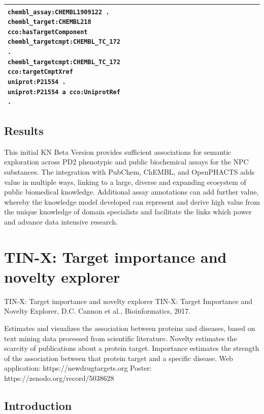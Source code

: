 \begin{singlespace}
\begin{longtable}{p{0.4\linewidth}p{0.6\linewidth}}
{\texttt{chembl\_assay:CHEMBL1909122 .}\\ \texttt{chembl\_target:CHEMBL218}\\
\texttt{cco:hasTargetComponent}\\ \texttt{chembl\_targetcmpt:CHEMBL\_TC\_172 .}\\ \texttt{chembl\_targetcmpt:CHEMBL\_TC\_172}\\ \texttt{cco:targetCmptXref}\\ \texttt{uniprot:P21554 .}\\ \texttt{uniprot:P21554 a cco:UniprotRef . }} \\
\hline
\end{longtable}
\end{singlespace}

\subsection{Results}

This initial KN Beta Version provides sufficient associations for semantic exploration across PD2 phenotypic and public biochemical assays for the NPC substances.  The integration with PubChem, ChEMBL, and OpenPHACTS adds value in multiple ways, linking to a large, diverse and expanding ecosystem of public biomedical knowledge.  Additional assay annotations can add further value, whereby the knowledge model developed can represent and derive high value from the unique knowledge of domain specialists and facilitate the links which power and advance data intensive research.



\section{TIN-X: Target importance and novelty explorer}

TIN-X: Target importance and novelty explorer
TIN-X: Target Importance and Novelty Explorer, D.C. Cannon et al., Bioinformatics, 2017\cite{Cannon2017-af}.

Estimates and visualizes the association between proteins and diseases, based on text mining data processed from scientific literature.  Novelty estimates the scarcity of publications about a protein target. Importance estimates the strength of the association between that protein target and a specific disease.
Web application: https://newdrugtargets.org
Poster: https://zenodo.org/record/5038628

\subsection{Introduction}

